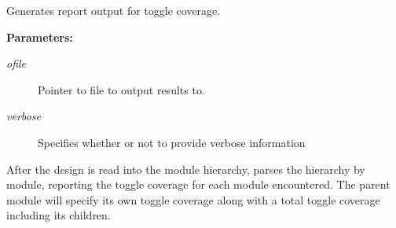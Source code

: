 Generates report output for toggle coverage.

\begin{Desc}
\item[{\bf Parameters: }]\par
\begin{description}
\item[
{\em ofile}]Pointer to file to output results to. \item[
{\em verbose}]Specifies whether or not to provide verbose information

\end{description}
\end{Desc}
After the design is read into the module hierarchy, parses the hierarchy by module, reporting the toggle coverage for each module encountered. The parent module will specify its own toggle coverage along with a total toggle coverage including its  children. 